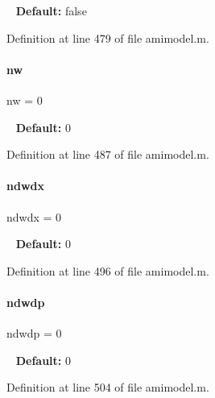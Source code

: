 ~\newline
{\bfseries Default\+:} false 

Definition at line 479 of file amimodel.\+m.

\mbox{\label{classamimodel_a371815f74d602ff1338376abbd1278e4}} 
\paragraph{\texorpdfstring{nw}{nw}}
{\footnotesize\ttfamily nw = 0}

~\newline
{\bfseries Default\+:} 0 

Definition at line 487 of file amimodel.\+m.

\mbox{\label{classamimodel_ae6c1afb5529f1cc0ff56552f94e7a2b5}} 
\paragraph{\texorpdfstring{ndwdx}{ndwdx}}
{\footnotesize\ttfamily ndwdx = 0}

~\newline
{\bfseries Default\+:} 0 

Definition at line 496 of file amimodel.\+m.

\mbox{\label{classamimodel_aa8af9048cd0280059bed9ef8999ecffb}} 
\paragraph{\texorpdfstring{ndwdp}{ndwdp}}
{\footnotesize\ttfamily ndwdp = 0}

~\newline
{\bfseries Default\+:} 0 

Definition at line 504 of file amimodel.\+m.

